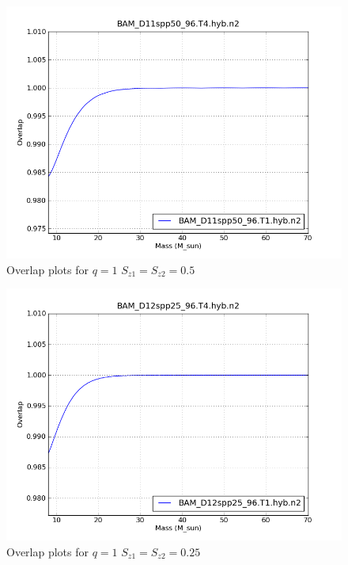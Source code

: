 \begin{figure}
  \includegraphics[width=\linewidth]{figures/ninja2/figure_1_0d5_01.png}
  \caption[Overlap plots for $q=1$ $S_{z1} = S_{z2} = 0.5$]{
  \label{f:figure_1_0d5}
Overlap plots for $q=1$ $S_{z1} = S_{z2} = 0.5$}
\end{figure}%


\begin{figure}
  \includegraphics[width=\linewidth]{figures/ninja2/figure_1_0d25_01.png}
  \caption[Overlap plots for $q=1$ $S_{z1} = S_{z2} = 0.25$]{
  \label{f:figure_1_0d25}
Overlap plots for $q=1$ $S_{z1} = S_{z2} = 0.25$}
\end{figure}%



